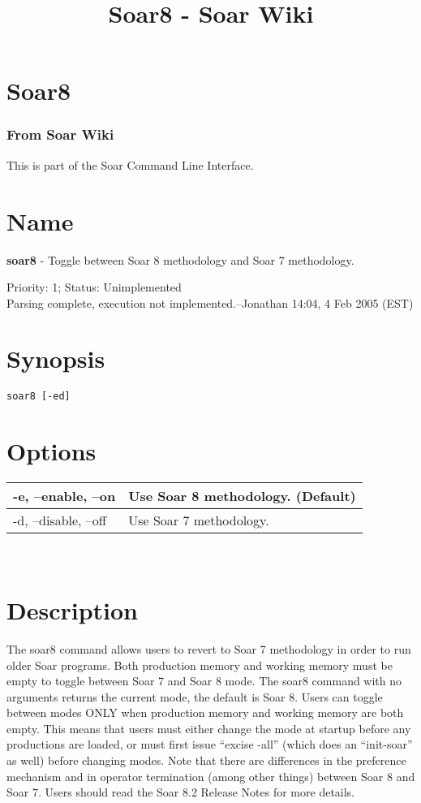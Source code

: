 \documentclass[10pt]{article}
\title{Soar8 - Soar Wiki}
\begin{document}
\section*{Soar8}
\subsubsection*{From Soar Wiki}


 This is part of the Soar Command Line Interface. 
\section*{ Name }


 \textbf{soar8}
 - Toggle between Soar 8 methodology and Soar 7 methodology. 


 Priority: 1; Status: Unimplemented\\ 
Parsing complete, execution not implemented.--Jonathan 14:04, 4 Feb 2005 (EST) 
\section*{ Synopsis }
\begin{verbatim}
soar8 [-ed]

\end{verbatim}
\section*{ Options }


\begin{tabular}{|p{1in}|p{5in}|}
\hline 
 -e, --enable, --on  & Use Soar 8 methodology. (Default)  \\
 \hline 
 -d, --disable, --off  & Use Soar 7 methodology.  \\
 \hline 

\end{tabular}



 \\ 

\section*{ Description }


 The soar8 command allows users to revert to Soar 7 methodology in order to run older Soar programs. Both production memory and working memory must be empty to toggle between Soar 7 and Soar 8 mode. The soar8 command with no arguments returns the current mode, the default is Soar 8. Users can toggle between modes ONLY when production memory and working memory are both empty. This means that users must either change the mode at startup before any productions are loaded, or must first issue ``excise -all'' (which does an ``init-soar'' as well) before changing modes. Note that there are differences in the preference mechanism and in operator termination (among other things) between Soar 8 and Soar 7. Users should read the Soar 8.2 Release Notes for more details. 
\end{document}
